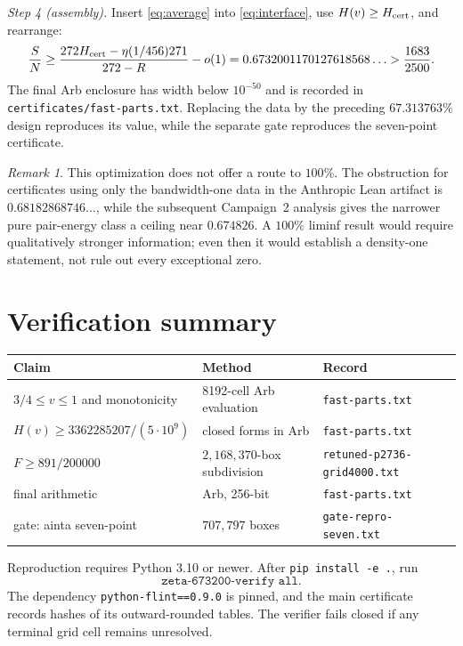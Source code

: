 \documentclass[11pt]{article}
\theoremstyle{remark}
\newtheorem{remark}[theorem]{Remark}
\begin{document}
\emph{Step 4 (assembly).}
Insert \eqref{eq:average} into \eqref{eq:interface}, use
$H(v)\ge H_{\rm cert}$, and rearrange:
\[
\frac SN\ge
\frac{272H_{\rm cert}-\eta(1/456)271}{272-R}-o(1)
=0.6732001170127618568\ldots
>\frac{1683}{2500}.
\]
The final Arb enclosure has width below $10^{-50}$ and is recorded in
\texttt{certificates/fast-parts.txt}.  Replacing the data by the preceding
$67.313763\%$ design reproduces its value, while the separate gate reproduces
the \cite{Ainta2026} seven-point certificate.

\begin{remark}
This optimization does not offer a route to $100\%$.  The obstruction for
certificates using only the bandwidth-one data in the Anthropic Lean artifact
is $0.68182868746\ldots$, while the subsequent Campaign~2 analysis gives the
narrower pure pair-energy class a ceiling near $0.674826$.  A $100\%$ liminf
result would require qualitatively stronger information; even then it would
establish a density-one statement, not rule out every exceptional zero.
\end{remark}

\appendix

\section{Verification summary}\label{app:verification}

\begin{center}
\begin{tabular}{lll}
\toprule
Claim & Method & Record \\
\midrule
$3/4\le v\le1$ and monotonicity & 8192-cell Arb evaluation
  & \texttt{fast-parts.txt} \\
$H(v)\ge3362285207/(5\cdot10^9)$ & closed forms in Arb
  & \texttt{fast-parts.txt} \\
$F\ge891/200000$ & $2{,}168{,}370$-box subdivision
  & \texttt{retuned-p2736-grid4000.txt} \\
final arithmetic & Arb, 256-bit & \texttt{fast-parts.txt} \\
gate: ainta seven-point & $707{,}797$ boxes
  & \texttt{gate-repro-seven.txt} \\
\bottomrule
\end{tabular}
\end{center}

Reproduction requires Python 3.10 or newer.  After
\texttt{pip install -e .}, run
\[
\texttt{zeta-673200-verify all}.
\]
The dependency \texttt{python-flint==0.9.0} is pinned, and the main
certificate records hashes of its outward-rounded tables.  The verifier
fails closed if any terminal grid cell remains unresolved.
\end{document}
